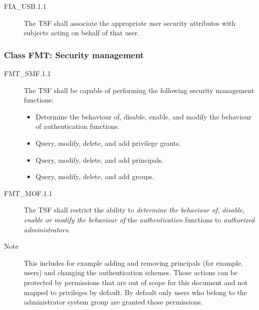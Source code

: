 \documentclass[12pt,english]{scrbook}
\begin{document}
\begin{description}

\item[FIA{\_}USB.1.1]


The TSF shall associate the appropriate user security
attributes with subjects acting on behalf of that user.



\end{description}





\subsubsection{Class FMT: Security management}



\begin{description}

\item[FMT{\_}SMF.1.1]

The TSF shall be capable of performing the following security management
functions:

\begin{itemize}
    \item Determine the behaviour of, disable, enable, and modify the
behaviour of authentication functions.
    \item Query, modify, delete, and add privilege grants.
    \item Query, modify, delete, and add principals.
    \item Query, modify, delete, and add groups.
\end{itemize}

\end{description}




\begin{description}

\item[FMT{\_}MOF.1.1]

The TSF shall restrict the ability to \emph{determine the
behaviour of, disable, enable or modify the behaviour of} the
\emph{authentication} functions to \emph{authorized administrators}.

\item[Note]
This includes for example adding and removing principals (for example,
users) and changing the authentication schemes. Those actions can be
protected by permissions that are out of scope for this document and not
mapped to privileges by default.
By default only users who belong to the administrator system group are
granted those permissions.

\end{description}
\end{document}
